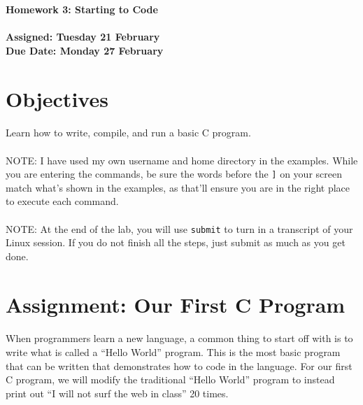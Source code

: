 \documentclass[letter,11pt]{article}
\begin{document}
\huge
\textbf{Homework 3: Starting to Code}
\normalsize
\\ ~~ \\
\textbf{Assigned: Tuesday 21 February} \\
\textbf{Due Date: Monday 27 February}

\section*{Objectives}
\paragraph{}Learn how to write, compile, and run a basic C program.

\paragraph{}NOTE: I have used my own username and home directory in the examples. While you are entering the commands, be sure the words before the \texttt{]} on your screen match what’s shown in the examples, as that’ll ensure you are in the right place to execute each command.

\paragraph{}NOTE: At the end of the lab, you will use \texttt{submit} to turn in a transcript of your Linux session. If you do not finish all the steps, just submit as much as you get done.

\section*{Assignment: Our First C Program}
\paragraph{}When programmers learn a new language, a common thing to start off with is to write what is called a ``Hello World'' program. This is the most basic program that can be written that demonstrates how to code in the language. For our first C program, we will modify the traditional ``Hello World'' program to instead print out ``I will not surf the web in class'' 20 times.
\end{document}
